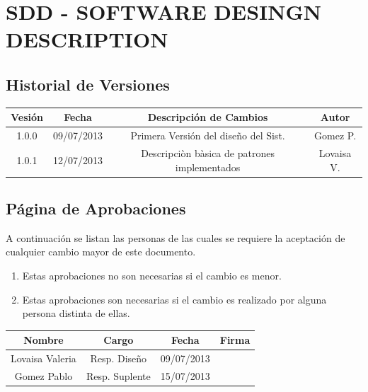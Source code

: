 \chapter{\textcolor[gray]{.8}{SDD - SOFTWARE DESINGN DESCRIPTION}}
\newpage
\section{\textcolor[gray]{.2}{Historial de Versiones}}
\begin{table}[!h]
\begin{center}
\begin{tabular}{|c|c|c|c|}
\hline
\rowcolor[gray]{.8} Vesión & Fecha & Descripción de Cambios & Autor\\
\hline
1.0.0 & 09/07/2013 & Primera Versión del diseño del Sist. & Gomez P.\\
\hline
1.0.1 & 12/07/2013 & Descripciòn bàsica de patrones implementados & Lovaisa V.\\
\hline
\end{tabular}
\end{center}
\end{table}
\newpage

\section{\textcolor[gray]{.2}{Página de Aprobaciones}}
A continuación se listan las personas de las cuales se requiere la aceptación de
cualquier cambio mayor de este documento.
\begin{enumerate}
  \item Estas aprobaciones no son necesarias si el cambio es menor.
  \item Estas aprobaciones son necesarias si el cambio es realizado por alguna
  persona distinta de ellas.
\end{enumerate}
\begin{table}[!h]
\begin{center}
\begin{tabular}{|c|c|c|c|}
\hline
\rowcolor[gray]{.8} Nombre & Cargo & Fecha & Firma\\
\hline
Lovaisa Valeria & Resp. Diseño & 09/07/2013 & \\
\hline
Gomez Pablo & Resp. Suplente & 15/07/2013 & \\
\hline
\end{tabular}
\end{center}
\end{table}

\newpage
